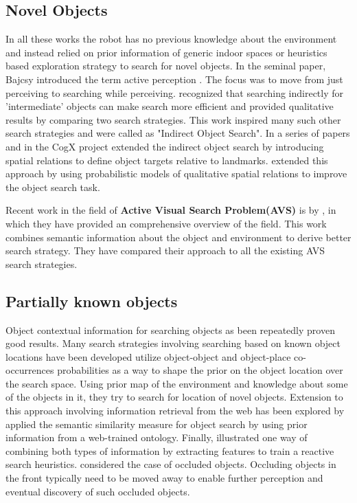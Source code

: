 \documentclass{llncs}
\begin{document}
\subsection{Novel Objects}
In all these works the robot has no previous knowledge about the environment and instead relied on prior information of generic indoor spaces or heuristics based exploration strategy to search for novel objects. In the seminal paper, Bajcsy introduced the term active perception \cite {bajcsy1988active}. The focus was to move from just perceiving to searching while perceiving.
\cite{wixson1994using} recognized that searching indirectly for 'intermediate' objects can make search more efficient and provided qualitative results by comparing two search strategies. This work inspired many such other search strategies and were called as "Indirect Object Search". 
In a series of papers \cite{aydemir_plan-based_2011} and
\cite{aydemir_exploiting_2012}  in the CogX project 
extended the indirect object search by introducing spatial relations to define object targets relative to landmarks.
\cite{kunze_indirect_2014} extended this approach by using probabilistic models of qualitative spatial relations to improve the object search task.

Recent work in the field of \textbf{Active Visual Search Problem(AVS)} is by \cite{aydemir_active_2013}, in which they have provided an comprehensive overview of the field. This work combines semantic information about the object and environment to derive better search strategy. They have compared their approach to all the existing AVS search strategies.

\subsection{Partially known objects}
Object contextual information for searching objects as been repeatedly proven good results. Many search strategies involving searching based on known object locations have been developed
\cite{kollar_utilizing_2009} utilize object-object and object-place co-occurrences probabilities as a way to shape the prior on the object location over the search space. Using prior map of the environment and knowledge about some of the objects in it, they try to search for location of novel objects.
Extension to this approach involving information retrieval from the web has been explored by \cite {samadi_using_2012}
\cite{kunze_searching_2012} applied the semantic similarity measure for object search by using prior information from a web-trained ontology.
Finally, \cite{joho_learning_2011} illustrated one way of combining both types of information by extracting features to train a reactive search heuristics.
\cite{wong_using_2014} considered the case of occluded objects. Occluding objects in the front typically need to be moved away to enable further perception and eventual discovery of such occluded objects. 
\end{document}
